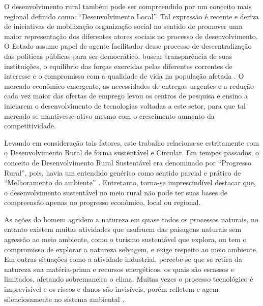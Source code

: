 
O desenvolvimento rural também pode ser compreendido por um conceito mais regional definido como: “Desenvolvimento Local”. Tal expressão é recente e deriva de iniciativas de mobilização organização social no sentido de promover uma maior representação dos diferentes atores sociais no processo de desenvolvimento. O Estado assume papel de agente facilitador desse processo de descentralização das políticas públicas para ser democrático, buscar transparência de suas instituições, o equilíbrio das forças exercidas pelas diferentes correntes de interesse e o compromisso com a qualidade de vida na população afetada \cite{castro_agricultura_2017}. O mercado econômico emergente, as necessidades de entregas urgentes e a redução cada vez maior das ofertas de emprego levou os centros de pesquisa e ensino a iniciarem o desenvolvimento de tecnologias voltadas a este setor, para que tal mercado se mantivesse ativo mesmo com o crescimento aumento da competitividade. 



Levando em consideração tais fatores, este trabalho relaciona-se estritamente com o Desenvolvimento Rural de forma sustentável e Circular. Em tempos passados, o conceito de Desenvolvimento Rural Sustentável era denominado por “Progresso Rural”, pois, havia um entendido genérico como sentido parcial e prático de “Melhoramento do ambiente” \cite{almeida_da_1995}. Entretanto, torna-se imprescindível destacar que, o desenvolvimento sustentável no meio rural não pode ter suas bases de compreensão apenas no progresso econômico, local ou regional.

As ações do homem agridem a natureza em quase todos os processos naturais, no entanto existem muitas atividades que usufruem das paisagens naturais sem agressão ao meio ambiente, como o turismo sustentável que explora, ou tem o compromisso de explorar a natureza selvagem, e exige respeito ao meio ambiente. Em outras situações como a atividade industrial, percebe-se que se retira da natureza sua matéria-prima e recursos energéticos, os quais são escassos e limitados, afetando sobremaneira o clima. Muitas vezes o processo tecnológico é imprevisível e os riscos e danos são invisíveis, porém refletem e agem silenciosamente no sistema ambiental \cite{marques_natureza_2017}.

